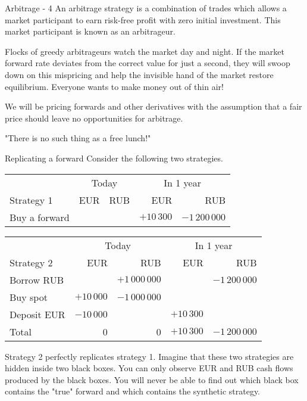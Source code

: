 \documentclass{beamer}
\begin{document}
\begin{frame}{Arbitrage - 4}
\justify
An \alert{arbitrage strategy} is a combination of trades which allows a market participant to earn risk-free profit with zero initial investment. This market participant is known as an \alert{arbitrageur}.

\justify
Flocks of greedy arbitrageurs watch the market day and night. If the market forward rate deviates from the correct value for just a second, they will swoop down on this mispricing and help the invisible hand of the market restore equilibrium. Everyone wants to make money out of thin air!

\justify
We will be pricing forwards and other derivatives with the assumption that a fair price should leave no opportunities for arbitrage.

\justify
"There is no such thing as a free lunch!"
\end{frame}



\begin{frame}{Replicating a forward}
\justify
Consider the following two strategies.

\justify
\small{
\begin{tabular}{l|r|r|r|r}
 & \multicolumn{2}{c|}{Today} & \multicolumn{2}{c}{In 1 year} \\ \cline{2-5}
Strategy  1& EUR & RUB & EUR & RUB \\ \hline
Buy a forward &                              &                                & $+10\,300$ & $-1\,200\,000$
\end{tabular}
}

\justify
\small{
\begin{tabular}{l|r|r|r|r}
& \multicolumn{2}{c|}{Today} & \multicolumn{2}{c}{In 1 year} \\ \cline{2-5}
Strategy 2 & EUR & RUB & EUR & RUB \\ \hline
Borrow RUB &                             & $+1\,000\,000$ &                    & $-1\,200\,000$ \\
Buy spot        & $+10\,000$ & $-1\,000\,000$  &                     &                                  \\
Deposit EUR & $-10\,000$  &                                  & $+10\,300$ & \\  \hline
Total & 0 & 0 &  $+10\,300$ & $-1\,200\,000$
\end{tabular}
}

\justify
Strategy 2 perfectly \alert{replicates} strategy 1. Imagine that these two strategies are hidden inside two black boxes. You can only observe EUR and RUB cash flows produced by the black boxes. You will never be able to find out which black box contains the "true" forward and which contains the synthetic strategy.
\end{frame}
\end{document}
